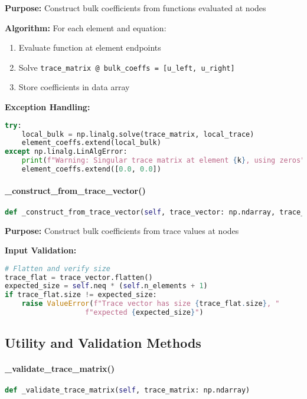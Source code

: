 \textbf{Purpose:} Construct bulk coefficients from functions evaluated at nodes

\textbf{Algorithm:} For each element and equation:
\begin{enumerate}
    \item Evaluate function at element endpoints
    \item Solve \texttt{trace\_matrix @ bulk\_coeffs = [u\_left, u\_right]}
    \item Store coefficients in data array
\end{enumerate}

\textbf{Exception Handling:}
\begin{lstlisting}[language=Python, caption=Function Construction Error Handling]
try:
    local_bulk = np.linalg.solve(trace_matrix, local_trace)
    element_coeffs.extend(local_bulk)
except np.linalg.LinAlgError:
    print(f"Warning: Singular trace matrix at element {k}, using zeros")
    element_coeffs.extend([0.0, 0.0])
\end{lstlisting}

\paragraph{\_construct\_from\_trace\_vector()}\leavevmode
\begin{lstlisting}[language=Python, caption=Trace Construction Method]
def _construct_from_trace_vector(self, trace_vector: np.ndarray, trace_matrix: np.ndarray)
\end{lstlisting}

\textbf{Purpose:} Construct bulk coefficients from trace values at nodes

\textbf{Input Validation:}
\begin{lstlisting}[language=Python, caption=Trace Vector Validation]
# Flatten and verify size
trace_flat = trace_vector.flatten()
expected_size = self.neq * (self.n_elements + 1)
if trace_flat.size != expected_size:
    raise ValueError(f"Trace vector has size {trace_flat.size}, "
                   f"expected {expected_size}")
\end{lstlisting}

\subsection{Utility and Validation Methods}
\label{subsec:utility_methods}

\paragraph{\_validate\_trace\_matrix()}\leavevmode
\begin{lstlisting}[language=Python, caption=Trace Matrix Validation Method]
def _validate_trace_matrix(self, trace_matrix: np.ndarray)
\end{lstlisting}

